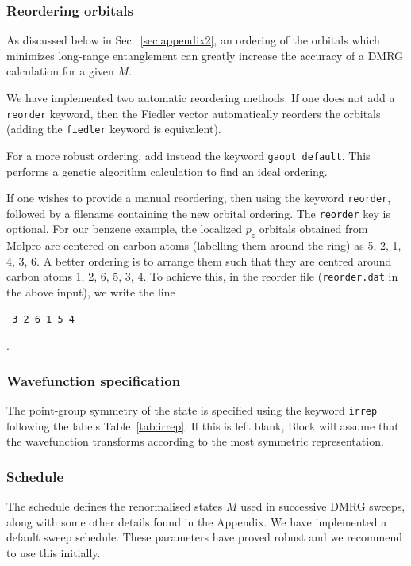 \documentclass[letterpaper,12pt,aps, pra]{revtex4-1}
\begin{document}
\subsubsection{Reordering orbitals}
As discussed below in Sec.~\ref{sec:appendix2}, an ordering of the orbitals
which minimizes long-range entanglement can greatly increase the accuracy of a
DMRG calculation for a given $M$. 

We have implemented two automatic reordering methods. If one does not add a \texttt{reorder} keyword, then the Fiedler vector automatically reorders the orbitals (adding the \texttt{fiedler} keyword is equivalent).

For a more robust ordering, add instead the keyword \texttt{gaopt default}. This performs a genetic algorithm calculation to find an ideal ordering.

If one wishes to provide a manual reordering, then 
using the keyword \texttt{reorder}, followed by a filename containing the new
orbital ordering.  
The \texttt{reorder} key is optional. 
For our benzene example, the localized $p_z$
orbitals obtained from Molpro are centered on carbon atoms (labelling them
around the ring) as 5, 2, 1, 4, 3, 6. A better ordering  is to arrange them
such that they are centred around carbon atoms 1, 2, 6, 5, 3, 4.  To achieve
this, in the reorder file (\texttt{reorder.dat} in the above input), we write
the line 
\begin{verbatim} 3 2 6 1 5 4 \end{verbatim}. 

\subsubsection{Wavefunction specification}

The point-group symmetry of the state is specified using the keyword \texttt{irrep} following the labels Table~\ref{tab:irrep}.
If this is left blank, Block will assume that the wavefunction transforms according to the most symmetric representation.


\subsubsection{Schedule}
The schedule defines the renormalised states $M$ used in successive DMRG
sweeps, along with some other details found in the Appendix. We have
implemented a default sweep schedule. These parameters have proved robust and
we recommend to use this initially.
\end{document}
